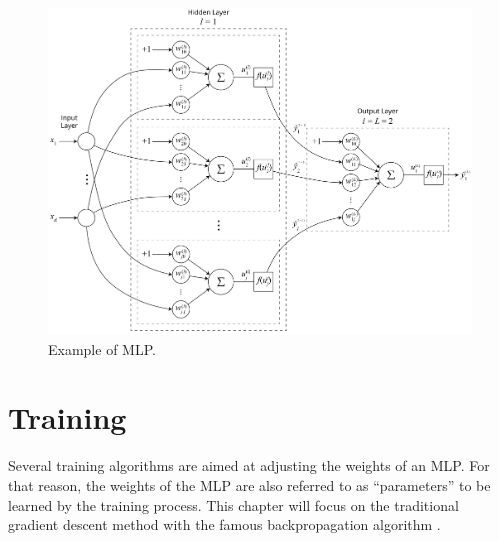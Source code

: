 \begin{figure}[h!]
    \centering
    \includegraphics[width=1\textwidth]{"Part 3 - Learning Systems/Supervised Learning/Multilayer Perceptron/figures/MLP_v2@4x.png"}
    \caption{Example of MLP.}
    \label{fig:mlp}
\end{figure}





\section{Training}
\label{ssec:treino}

Several training algorithms are aimed at adjusting the weights of an MLP. For that reason, the weights of the MLP are also referred to as ``parameters'' to be learned by the training process. This chapter will focus on the traditional gradient descent method with the famous backpropagation algorithm \cite{rumelhart1986learning}.

